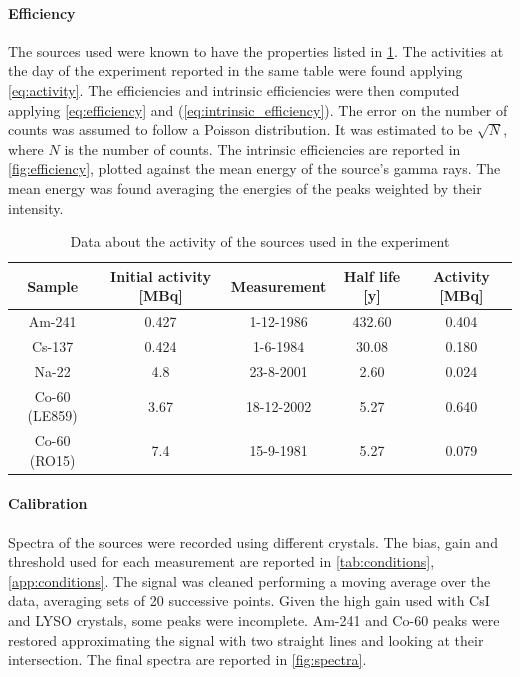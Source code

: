 \documentclass[a4paper, 11pt, table]{article}
\begin{document}
\paragraph{Efficiency}
The sources used were known to have the properties listed in \cref{tab:sources}. The activities at the day of the experiment reported in the same table were found applying \cref{eq:activity}. The efficiencies and intrinsic efficiencies were then computed applying \cref{eq:efficiency} and (\ref{eq:intrinsic_efficiency}). The error on the number of counts was assumed to follow a Poisson distribution. It was estimated to be $\sqrt{N}$, where $N$ is the number of counts. The intrinsic efficiencies are reported in \cref{fig:efficiency}, plotted against the mean energy of the source's gamma rays. The mean energy was found averaging the energies of the peaks weighted by their intensity.

\begin{table}
    \caption{Data about the activity of the sources used in the experiment}
    \label{tab:sources}
    \begin{tabular}{ccccc}
        \toprule
        Sample        & Initial activity [MBq] & Measurement & Half life [y] & Activity [MBq] \\
        \midrule
        Am-241        & 0.427                  & 1-12-1986   & 432.60        & 0.404          \\
        Cs-137        & 0.424                  & 1-6-1984    & 30.08         & 0.180          \\
        Na-22         & 4.8                    & 23-8-2001   & 2.60          & 0.024          \\
        Co-60 (LE859) & 3.67                   & 18-12-2002  & 5.27          & 0.640          \\
        Co-60 (RO15)  & 7.4                    & 15-9-1981   & 5.27          & 0.079          \\
        \bottomrule
    \end{tabular}
\end{table}

\paragraph{Calibration}
Spectra of the sources were recorded using different crystals. The bias, gain and threshold used for each measurement are reported in \cref{tab:conditions}, \cref{app:conditions}. The signal was cleaned performing a moving average over the data, averaging sets of 20 successive points. Given the high gain used with CsI and LYSO crystals, some peaks were incomplete. Am-241 and Co-60 peaks were restored approximating the signal with two straight lines and looking at their intersection. The final spectra are reported in \cref{fig:spectra}.\\
\end{document}
